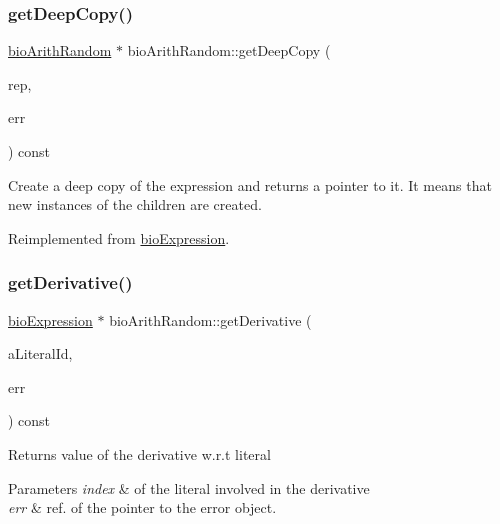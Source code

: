 \subsubsection{\texorpdfstring{get\+Deep\+Copy()}{getDeepCopy()}}
{\footnotesize\ttfamily \hyperlink{classbio_arith_random}{bio\+Arith\+Random} $\ast$ bio\+Arith\+Random\+::get\+Deep\+Copy (\begin{DoxyParamCaption}\item[{\hyperlink{classbio_expression_repository}{bio\+Expression\+Repository} $\ast$}]{rep,  }\item[{pat\+Error $\ast$\&}]{err }\end{DoxyParamCaption}) const\hspace{0.3cm}{\ttfamily [virtual]}}

Create a deep copy of the expression and returns a pointer to it. It means that new instances of the children are created. 

Reimplemented from \hyperlink{classbio_expression_a4ee1b8add634078a02eaae26cd40dcc8}{bio\+Expression}.

\mbox{\label{classbio_arith_random_a20b4fe8de86bf00654a94b0d534e6743}} 
\subsubsection{\texorpdfstring{get\+Derivative()}{getDerivative()}}
{\footnotesize\ttfamily \hyperlink{classbio_expression}{bio\+Expression} $\ast$ bio\+Arith\+Random\+::get\+Derivative (\begin{DoxyParamCaption}\item[{pat\+U\+Long}]{a\+Literal\+Id,  }\item[{pat\+Error $\ast$\&}]{err }\end{DoxyParamCaption}) const\hspace{0.3cm}{\ttfamily [virtual]}}

\begin{DoxyReturn}{Returns}
value of the derivative w.\+r.\+t literal 
\end{DoxyReturn}

\begin{DoxyParams}{Parameters}
{\em index} & of the literal involved in the derivative \\
\hline
{\em err} & ref. of the pointer to the error object. \\
\hline
\end{DoxyParams}


